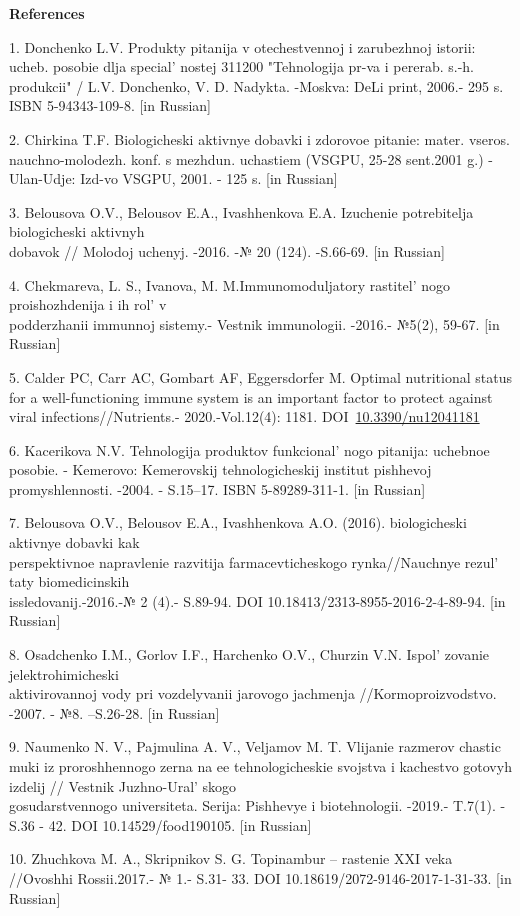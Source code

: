 \begin{center}
{\bfseries References}
\end{center}

\begin{references}
1. Donchenko L.V. Produkty pitanija v otechestvennoj i zarubezhnoj
istorii: ucheb. posobie dlja special' nostej 311200
"Tehnologija pr-va i pererab. s.-h. produkcii" / L.V. Donchenko, V. D.
Nadykta. -Moskva: DeLi print, 2006.- 295 s. ISBN 5-94343-109-8. {[}in
Russian{]}

2. Chirkina T.F. Biologicheski aktivnye dobavki i zdorovoe pitanie:
mater. vseros. nauchno-molodezh. konf. s mezhdun. uchastiem (VSGPU,
25-28 sent.2001 g.) - Ulan-Udje: Izd-vo VSGPU, 2001. - 125 s. {[}in
Russian{]}

3. Belousova O.V., Belousov E.A., Ivashhenkova E.A. Izuchenie
potrebitelja biologicheski aktivnyh \\dobavok // Molodoj uchenyj. -2016.
-№ 20 (124). -S.66-69. {[}in Russian{]}

4. Chekmareva, L. S., Ivanova, M. M.Immunomoduljatory
rastitel' nogo proishozhdenija i ih rol'{}
v \\podderzhanii immunnoj sistemy.- Vestnik immunologii. -2016.- №5(2),
59-67. {[}in Russian{]}

5. Calder PC, Carr AC, Gombart AF, Eggersdorfer M. Optimal nutritional
status for a well-functioning immune system is an important factor to
protect against viral infections//Nutrients.- 2020.-Vol.12(4): 1181.
DOI~\href{https://doi.org/10.3390/nu12041181}{10.3390/nu12041181}

6. Kacerikova N.V. Tehnologija produktov funkcional' nogo
pitanija: uchebnoe posobie. - Kemerovo: Kemerovskij tehnologicheskij
institut pishhevoj promyshlennosti. -2004. - S.15--17. ISBN
5-89289-311-1. {[}in Russian{]}

7. Belousova O.V., Belousov E.A., Ivashhenkova A.O. (2016). biologicheski
aktivnye dobavki kak \\perspektivnoe napravlenie razvitija
farmacevticheskogo rynka//Nauchnye rezul' taty
biomedicinskih \\issledovanij.-2016.-№ 2 (4).- S.89-94. DOI
10.18413/2313-8955-2016-2-4-89-94. {[}in Russian{]}

8. Osadchenko I.M., Gorlov I.F., Harchenko O.V., Churzin V.N.
Ispol' zovanie jelektrohimicheski \\aktivirovannoj vody pri
vozdelyvanii jarovogo jachmenja //Kormoproizvodstvo. -2007. - №8.
--S.26-28. {[}in Russian{]}

9. Naumenko N. V., Pajmulina A. V., Veljamov M. T. Vlijanie razmerov
chastic muki iz proroshhennogo zerna na ee tehnologicheskie svojstva i
kachestvo gotovyh izdelij // Vestnik Juzhno-Ural' skogo
\\gosudarstvennogo universiteta. Serija: Pishhevye i biotehnologii.
-2019.- T.7(1). - S.36 - 42. DOI 10.14529/food190105. {[}in Russian{]}

10. Zhuchkova M. A., Skripnikov S. G. Topinambur -- rastenie XXI veka
//Ovoshhi Rossii.2017.- № 1.- S.31- 33. DOI
10.18619/2072-9146-2017-1-31-33. {[}in Russian{]}
\end{references}

